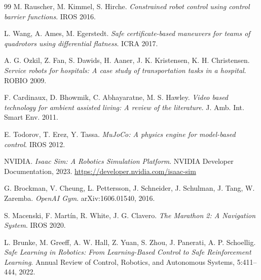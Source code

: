 \documentclass[letterpaper]{article}
\begin{document}
\begin{thebibliography}{99}
M. Rauscher, M. Kimmel, S. Hirche.
\textit{Constrained robot control using control barrier functions}.
IROS 2016.

L. Wang, A. Ames, M. Egerstedt.
\textit{Safe certificate-based maneuvers for teams of quadrotors using differential flatness}.
ICRA 2017.

A. G. Ozkil, Z. Fan, S. Dawids, H. Aaner, J. K. Kristensen, K. H. Christensen.
\textit{Service robots for hospitals: A case study of transportation tasks in a hospital}.
ROBIO 2009.

F. Cardinaux, D. Bhowmik, C. Abhayaratne, M. S. Hawley.
\textit{Video based technology for ambient assisted living: A review of the literature}.
J. Amb. Int. Smart Env. 2011.

E. Todorov, T. Erez, Y. Tassa.
\textit{MuJoCo: A physics engine for model-based control}.
IROS 2012.

NVIDIA.
\textit{Isaac Sim: A Robotics Simulation Platform}.
NVIDIA Developer Documentation, 2023.
\url{https://developer.nvidia.com/isaac-sim}

G. Brockman, V. Cheung, L. Pettersson, J. Schneider, J. Schulman, J. Tang, W. Zaremba.
\textit{OpenAI Gym}.
arXiv:1606.01540, 2016.

S. Macenski, F. Mart\'in, R. White, J. G. Clavero.
\textit{The Marathon 2: A Navigation System}.
IROS 2020.

L. Brunke, M. Greeff, A. W. Hall, Z. Yuan, S. Zhou, J. Panerati, A. P. Schoellig.
\textit{Safe Learning in Robotics: From Learning-Based Control to Safe Reinforcement Learning}.
Annual Review of Control, Robotics, and Autonomous Systems, 5:411--444, 2022.

\end{thebibliography}
\end{document}
